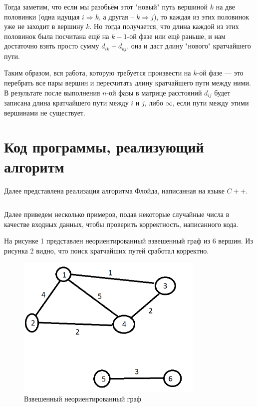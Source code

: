 \documentclass[bachelor, och, labwork]{shiza}
\begin{document}
 Тогда заметим, что если мы разобьём этот "новый" путь вершиной $k$ на две половинки (одна идущая $i \Rightarrow k$, а другая -- $k \Rightarrow j$), то каждая из этих половинок уже не заходит в вершину $k$. Но тогда получается, что длина каждой из этих половинок была посчитана ещё на $k-1$-ой фазе или ещё раньше, и нам достаточно взять просто сумму $d_{ik} + d_{kj}$, она и даст длину "нового" кратчайшего пути.
 
 Таким образом, вся работа, которую требуется произвести на $k$-ой фазе — это перебрать все пары вершин и пересчитать длину кратчайшего пути между ними. В результате после выполнения $n$-ой фазы в матрице расстояний $d_{ij}$ будет записана длина кратчайшего пути между $i$ и $j$, либо $\infty$, если пути между этими вершинами не существует.


  \section{Код программы, реализующий алгоритм}

  Далее представлена реализация алгоритма Флойда, написанная на языке $C++$.

  
  \inputminted[fontsize=\small]{C++}{code/floyd.cpp}

  Далее приведем несколько примеров, подав некоторые случайные числа в качестве входных данных, чтобы проверить корректность, написанного
  кода.

  На рисунке 1 представлен неориентированный взвешенный граф из 6 вершин. Из рисунка 2 видно, что поиск кратчайших путей сработал корректно.

  \begin{figure}[H]
    \centering
    \includegraphics[width=0.8\textwidth]{img/2_1}
    \caption{Взвешенный неориентированный граф}
  \end{figure}
\end{document}
